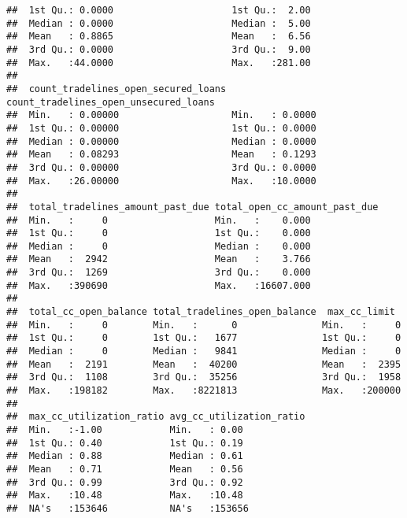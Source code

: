 \documentclass[ignorenonframetext,]{beamer}
\begin{document}
\begin{frame}[fragile]
\begin{verbatim}
##  1st Qu.: 0.0000                     1st Qu.:  2.00                  
##  Median : 0.0000                     Median :  5.00                  
##  Mean   : 0.8865                     Mean   :  6.56                  
##  3rd Qu.: 0.0000                     3rd Qu.:  9.00                  
##  Max.   :44.0000                     Max.   :281.00                  
##                                                                      
##  count_tradelines_open_secured_loans count_tradelines_open_unsecured_loans
##  Min.   : 0.00000                    Min.   : 0.0000                      
##  1st Qu.: 0.00000                    1st Qu.: 0.0000                      
##  Median : 0.00000                    Median : 0.0000                      
##  Mean   : 0.08293                    Mean   : 0.1293                      
##  3rd Qu.: 0.00000                    3rd Qu.: 0.0000                      
##  Max.   :26.00000                    Max.   :10.0000                      
##                                                                           
##  total_tradelines_amount_past_due total_open_cc_amount_past_due
##  Min.   :     0                   Min.   :    0.000            
##  1st Qu.:     0                   1st Qu.:    0.000            
##  Median :     0                   Median :    0.000            
##  Mean   :  2942                   Mean   :    3.766            
##  3rd Qu.:  1269                   3rd Qu.:    0.000            
##  Max.   :390690                   Max.   :16607.000            
##                                                                
##  total_cc_open_balance total_tradelines_open_balance  max_cc_limit   
##  Min.   :     0        Min.   :      0               Min.   :     0  
##  1st Qu.:     0        1st Qu.:   1677               1st Qu.:     0  
##  Median :     0        Median :   9841               Median :     0  
##  Mean   :  2191        Mean   :  40200               Mean   :  2395  
##  3rd Qu.:  1108        3rd Qu.:  35256               3rd Qu.:  1958  
##  Max.   :198182        Max.   :8221813               Max.   :200000  
##                                                                      
##  max_cc_utilization_ratio avg_cc_utilization_ratio
##  Min.   :-1.00            Min.   : 0.00           
##  1st Qu.: 0.40            1st Qu.: 0.19           
##  Median : 0.88            Median : 0.61           
##  Mean   : 0.71            Mean   : 0.56           
##  3rd Qu.: 0.99            3rd Qu.: 0.92           
##  Max.   :10.48            Max.   :10.48           
##  NA's   :153646           NA's   :153656          

\end{verbatim}
\end{frame}
\end{document}
